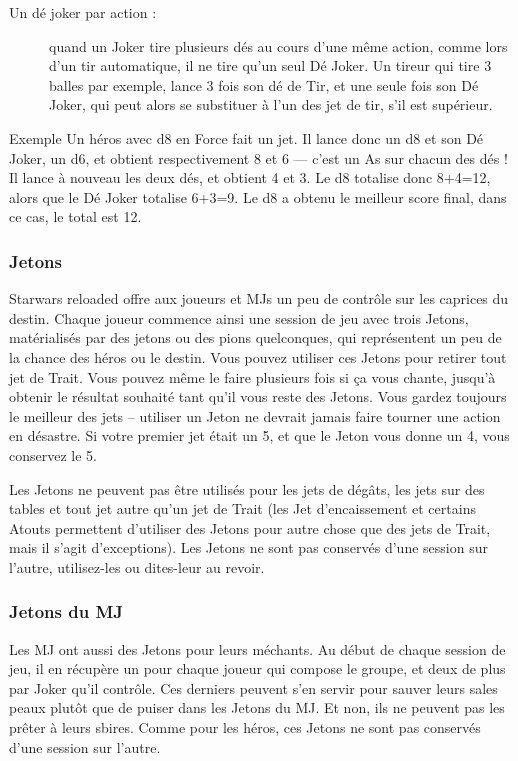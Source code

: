 \begin{description}
\item[Un dé joker par action :] quand un Joker tire plusieurs dés au cours d’une même action, comme lors d’un tir automatique, il ne tire qu’un seul Dé Joker. Un tireur qui tire 3 balles par exemple, lance 3 fois son dé de Tir, et une seule fois son Dé Joker, qui peut alors se substituer à l’un des jet de tir, s’il est supérieur.
\end{description}

\begin{commentbox}{Exemple}
Un héros avec d8 en Force fait un jet. Il lance donc un d8 et son Dé Joker, un d6, et obtient respectivement 8 et 6 — c’est un As sur chacun des dés ! Il lance à nouveau les deux dés, et obtient 4 et 3. Le d8 totalise donc 8+4=12, alors que le Dé Joker totalise 6+3=9. Le d8 a obtenu le meilleur score final, dans ce cas, le total est 12.
\end{commentbox}

\subsubsection{Jetons}
{\jedifont Starwars reloaded} offre aux joueurs et MJs un peu de contrôle sur les caprices du destin. Chaque joueur commence ainsi une session de jeu avec trois Jetons, matérialisés par des jetons ou des pions quelconques, qui représentent un peu de la chance des héros ou le destin. Vous pouvez utiliser ces Jetons pour retirer tout jet de Trait. Vous pouvez même le faire plusieurs fois si ça vous chante, jusqu’à obtenir le résultat souhaité tant qu’il vous reste des Jetons. Vous gardez toujours le meilleur des jets – utiliser un Jeton ne devrait jamais faire tourner une action en désastre. Si votre premier jet était un 5, et que le Jeton vous donne un 4, vous conservez le 5.

Les Jetons ne peuvent pas être utilisés pour les jets de dégâts, les jets sur des tables et tout jet autre qu’un jet de Trait (les Jet d’encaissement et certains Atouts permettent d’utiliser des Jetons pour autre chose que des jets de Trait, mais il s’agit d’exceptions). Les Jetons ne sont pas conservés d’une session sur l’autre, utilisez-les ou dites-leur au revoir.

\subsubsection{Jetons du MJ}
Les MJ ont aussi des Jetons pour leurs méchants. Au début de chaque session de jeu, il en récupère un pour chaque joueur qui compose le groupe, et deux de plus par Joker qu’il contrôle. Ces derniers peuvent s’en servir pour sauver leurs sales peaux plutôt que de puiser dans les Jetons du MJ. Et non, ils ne peuvent pas les prêter à leurs sbires. Comme pour les héros, ces Jetons ne sont pas conservés d’une session sur l’autre.

